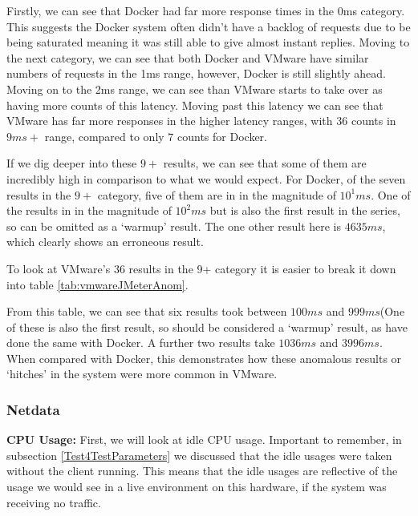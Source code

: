 Firstly, we can see that Docker had far more response times in the 0ms category. This suggests the Docker system often didn't have a backlog of requests due to be being saturated meaning it was still able to give almost instant replies. Moving to the next category, we can see that both Docker and VMware have similar numbers of requests in the 1ms range, however, Docker is still slightly ahead. Moving on to the 2ms range, we can see than VMware starts to take over as having more counts of this latency. Moving past this latency we can see that VMware has far more responses in the higher latency ranges, with 36 counts in \(9ms+\) range, compared to only \(7\) counts for Docker.

If we dig deeper into these \(9+\) results, we can see that some of them are incredibly high in comparison to what we would expect. For Docker, of the seven results in the \(9+\) category, five of them are in in the magnitude of \(10^1ms\). One of the results in in the magnitude of \(10^2ms\) but is also the first result in the series, so can be omitted as a `warmup' result. The one other result here is \(4635ms\), which clearly shows an erroneous result.

To look at VMware's 36 results in the 9+ category it is easier to break it down into table \ref{tab:vmwareJMeterAnom}.

\begin{table}[H]
\centering
\caption{Magnitude of latencies for VMware that are over \(9ms\)}
\label{tab:vmwareJMeterAnom}
\end{table}

From this table, we can see that six results took between \(100ms\) and \(999ms\)(One of these is also the first result, so should be considered a `warmup' result, as have done the same with Docker. A further two results take \(1036ms\) and \(3996ms\). When compared with Docker, this demonstrates how these anomalous results or `hitches' in the system were more common in VMware.

\subsubsection{Netdata}
\textbf{CPU Usage:}
First, we will look at idle CPU usage. Important to remember, in subsection \ref{Test4TestParameters} we discussed that the idle usages were taken without the client running. This means that the idle usages are reflective of the usage we would see in a live environment on this hardware, if the system was receiving no traffic.

